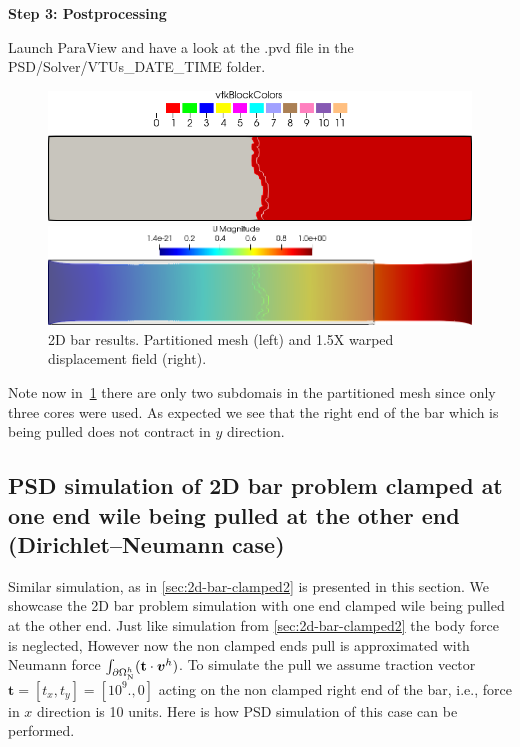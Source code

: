 {{\textbf{Step 3: Postprocessing}

Launch ParaView and have a look at the  {\ttfamily .pvd} file in the  {\ttfamily PSD/Solver/VTUs\_DATE\_TIME} folder. 

\begin{figure}[htbp]
    \centering
    \begin{minipage}[t][2cm][t]{0.39\textwidth}
    \includegraphics[align=t,width=1\textwidth]{./Images/2d-bar-clamped-pulled-partioned.png}
    \end{minipage}\hspace{.1\textwidth}
    \begin{minipage}[t][2cm][t]{0.5\textwidth}
    \includegraphics[align=t,width=1\textwidth]{./Images/2d-bar-clamped-pulled.png}
    \end{minipage}
    \caption{2D bar results. Partitioned mesh (left) and 1.5X warped displacement field (right).}
    \label{fig:2part}
\end{figure}

Note now in~\cref{fig:2part} there are only two subdomais in the partitioned mesh since only three cores were used. As expected we see that the right end of the bar which is being pulled does not contract in $y$ direction.
\pagebreak


\subsection{PSD simulation of 2D bar problem clamped at one end wile being pulled at the other end (Dirichlet--Neumann case)\label{sec:2d-bar-clamped3}}


Similar simulation, as in \cref{sec:2d-bar-clamped2} is presented in this section. We showcase the 2D bar problem simulation with one end clamped wile being pulled at the other end. Just like simulation from \cref{sec:2d-bar-clamped2} the body force is neglected, However now  the non clamped ends pull is approximated with Neumann force $\int_{\partial\Omega^h_{\text N}}(\mathbf t\cdot \boldsymbol v^h)$. To simulate the pull we assume traction vector $\mathbf t=[t_x,t_y]=[10^9.,0]$ acting on the non clamped right end of the bar, i.e., force in $x$ direction is 10 units. Here is how PSD simulation of this case can be performed.

}}
